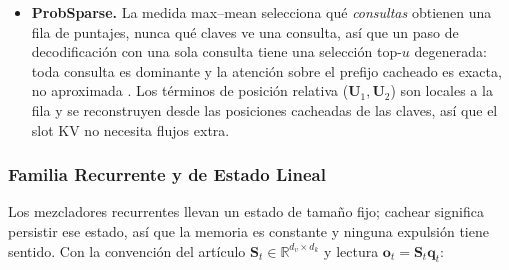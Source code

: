 \begin{itemize}[leftmargin=*]
    \item \textbf{ProbSparse.} La medida max--mean selecciona qué \emph{consultas} obtienen una fila de puntajes, nunca qué claves ve una consulta, así que un paso de decodificación con una sola consulta tiene una selección top-$u$ degenerada: toda consulta es dominante y la atención sobre el prefijo cacheado es exacta, no aproximada \citep{wu_deep_sparse_conformer_2022,zhou_informer_2021}. Los términos de posición relativa ($\mathbf{U}_1,\mathbf{U}_2$) son locales a la fila y se reconstruyen desde las posiciones cacheadas de las claves, así que el slot KV no necesita flujos extra.
\end{itemize}

\subsubsection{Familia Recurrente y de Estado Lineal}

Los mezcladores recurrentes llevan un estado de tamaño fijo; cachear significa persistir ese estado, así que la memoria es constante y ninguna expulsión tiene sentido. Con la convención del artículo $\mathbf{S}_t \in \mathbb{R}^{d_v\times d_k}$ y lectura $\mathbf{o}_t = \mathbf{S}_t\mathbf{q}_t$:

